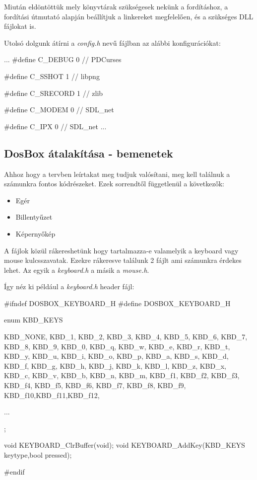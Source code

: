 Miután eldöntöttük mely könyvtárak szükségesek nekünk a fordításhoz, a fordítási útmutató alapján beállítjuk a linkereket megfelelően, és a szükséges DLL fájlokat is. 

Utolsó dolgunk átírni a \textit{config.h} nevű fájlban az alábbi konfigurációkat: 

\begin{cpp}

    ...
    #define C_DEBUG 0 // PDCurses

    #define C_SSHOT 1 // libpng

    #define C_SRECORD 1 // zlib

    #define C_MODEM 0 // SDL_net 

    #define C_IPX 0 // SDL_net 
    ...
\end{cpp}

\subsection{DosBox átalakítása - bemenetek}

Ahhoz hogy a tervben leírtakat meg tudjuk valósítani, meg kell találnuk a számunkra fontos kódrészeket. Ezek sorrendtől függetlenül a következők:

\begin{itemize}
    \item Egér 
    \item Billentyűzet
    \item Képernyőkép
\end{itemize}

A fájlok közül rákereshetünk hogy tartalmazza-e valamelyik a keyboard vagy mouse kulcsszavatak. Ezekre rákeresve találunk 2 fájlt ami számunkra érdekes lehet. Az egyik a \textit{keyboard.h} a másik a \textit{mouse.h}.

Így néz ki például a \textit{keyboard.h} header fájl:

\begin{cpp}
    #ifndef DOSBOX_KEYBOARD_H
    #define DOSBOX_KEYBOARD_H
    
    enum KBD_KEYS {
        KBD_NONE,
        KBD_1,	KBD_2,	KBD_3,	KBD_4,	KBD_5,	KBD_6,	KBD_7,	
        KBD_8,	KBD_9,	KBD_0,		
        KBD_q,	KBD_w,	KBD_e,	KBD_r,	KBD_t,	KBD_y,	KBD_u,	
        KBD_i,	KBD_o,	KBD_p,	
        KBD_a,	KBD_s,	KBD_d,	KBD_f,	KBD_g,	KBD_h,	KBD_j,	
        KBD_k,	KBD_l,	KBD_z,
        KBD_x,	KBD_c,	KBD_v,	KBD_b,	KBD_n,	KBD_m,	
        KBD_f1,	KBD_f2,	KBD_f3,	KBD_f4,	KBD_f5,	KBD_f6,	KBD_f7,	
        KBD_f8,	KBD_f9,	KBD_f10,KBD_f11,KBD_f12,

        ...
        
    };
    
    void KEYBOARD_ClrBuffer(void);
    void KEYBOARD_AddKey(KBD_KEYS keytype,bool pressed);
    
    #endif
\end{cpp}

